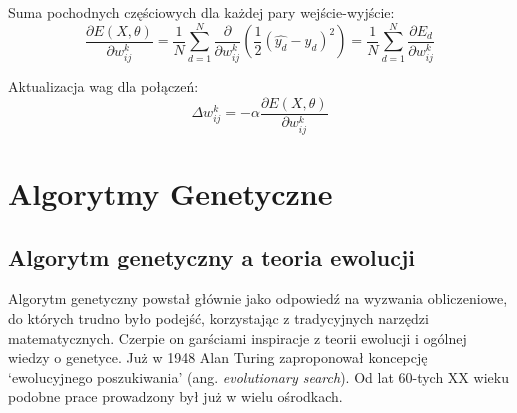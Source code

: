 \documentclass[a4paper,12pt]{article}
\numberwithin{figure}{section}
\begin{document}
    \smallskip

    \noindent
    \begin{minipage}[H]{\textwidth}
        \setlength\parindent{17pt} Suma pochodnych częściowych dla każdej pary wejście-wyjście: \\
        \begin{equation}
            \label{eq:partial_derivatives_combination_for_input_output_pairs}
            \frac{\partial E(X,\theta)}{\partial w_{ij}^k} = \frac{1}{N} \displaystyle\sum_{d=1}^N \frac{\partial}{\partial w_{ij}^k} (\frac{1}{2}(\widehat{y_d} - y_d)^2) = \frac{1}{N} \displaystyle\sum_{d=1}^N \frac{\partial E_d}{\partial w_{ij}^k}
        \end{equation}
    \end{minipage}

    \smallskip

    \noindent
    \begin{minipage}[H]{\textwidth}
        \setlength\parindent{17pt} Aktualizacja wag dla połączeń: \\
        \begin{equation}
            \label{eq:updating_weights}
            \Delta w_{ij}^k = -\alpha \frac{\partial E(X,\theta)}{\partial w_{ij}^k}
        \end{equation}
    \end{minipage}

    \newpage


    \section{Algorytmy Genetyczne}

    \subsection{Algorytm genetyczny a teoria ewolucji}

    Algorytm genetyczny powstał głównie jako odpowiedź na wyzwania obliczeniowe, do których trudno było podejść, korzystając z tradycyjnych narzędzi matematycznych. Czerpie on garściami inspiracje z teorii ewolucji i ogólnej wiedzy o genetyce. Już w 1948 Alan Turing zaproponował koncepcję `ewolucyjnego poszukiwania' (ang. \textit{evolutionary search}). Od lat 60-tych XX wieku podobne prace prowadzony był już w wielu ośrodkach\cite{IntroductionToEvolutionaryComputing2015}.

    \bigskip
\end{document}
